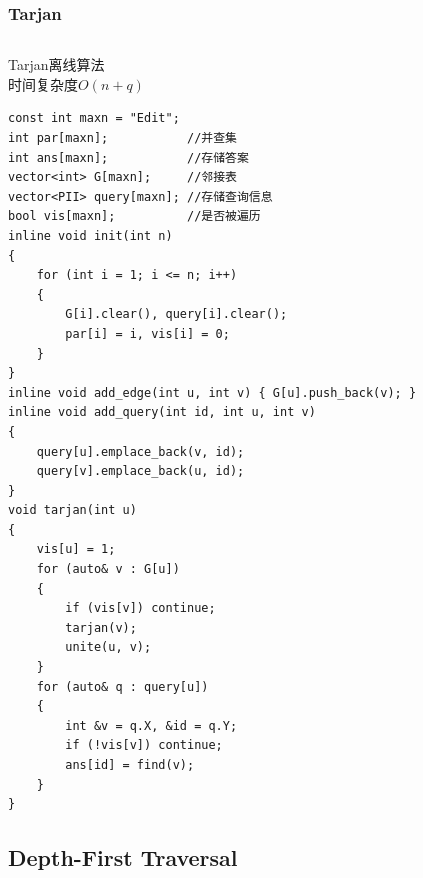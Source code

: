 \documentclass[twoside]{article}
\begin{document}
\subsubsection{Tarjan}
\begin{lstlisting}
\end{lstlisting}
Tarjan离线算法\\
时间复杂度$O(n+q)$
\begin{lstlisting}
const int maxn = "Edit";
int par[maxn];           //并查集
int ans[maxn];           //存储答案
vector<int> G[maxn];     //邻接表
vector<PII> query[maxn]; //存储查询信息
bool vis[maxn];          //是否被遍历
inline void init(int n)
{
    for (int i = 1; i <= n; i++)
    {
        G[i].clear(), query[i].clear();
        par[i] = i, vis[i] = 0;
    }
}
inline void add_edge(int u, int v) { G[u].push_back(v); }
inline void add_query(int id, int u, int v)
{
    query[u].emplace_back(v, id);
    query[v].emplace_back(u, id);
}
void tarjan(int u)
{
    vis[u] = 1;
    for (auto& v : G[u])
    {
        if (vis[v]) continue;
        tarjan(v);
        unite(u, v);
    }
    for (auto& q : query[u])
    {
        int &v = q.X, &id = q.Y;
        if (!vis[v]) continue;
        ans[id] = find(v);
    }
}
\end{lstlisting}
\subsection{Depth-First Traversal}
\end{document}

